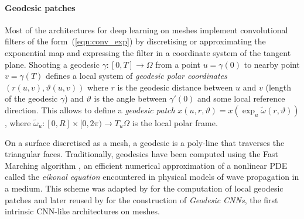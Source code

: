 \paragraph{Geodesic patches}
Most of the architectures for deep learning on meshes  implement convolutional filters of the form~(\ref{eqn:conv_exp}) by 
discretising or approximating the exponential map and expressing the filter in a coordinate system of the tangent plane. 
%
Shooting a geodesic $\gamma:[0,T]\rightarrow \Omega$ from a point $u=\gamma(0)$ to nearby point $v=\gamma(T)$ defines a local system of {\em geodesic polar coordinates} $(r(u,v),\vartheta(u,v))$ where $r$ is the geodesic distance between $u$ and $v$ (length of the geodesic $\gamma$) and $\vartheta$ is the angle between $\gamma'(0)$ and some local reference direction. %
%
This allows to define a {\em geodesic patch} $x(u,r,\vartheta) = x(\exp_u \tilde{\omega}(r,\vartheta))$, where $\tilde{\omega}_u: [0,R]\times [0,2\pi) \rightarrow T_u\Omega$ is the local polar frame. 




On a surface discretised as a mesh, a geodesic is a poly-line that traverses the triangular faces. Traditionally, geodesics have been computed using the Fast Marching algorithm \cite{kimmel1998computing}, an efficient numerical approximation of a nonlinear PDE called the {\em eikonal equation} encountered in physical models of wave propagation in a medium. This scheme was adapted by \cite{kokkinos2012intrinsic} for the computation of local geodesic patches and later reused by \cite{masci2015geodesic} for the  construction of {\em Geodesic CNNs}, the first intrinsic CNN-like architectures on meshes. 


